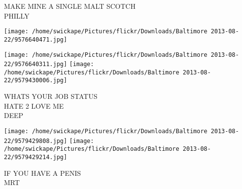 \documentclass[10pt,letterpaper]{article}
\begin{document}
MAKE MINE A SINGLE MALT SCOTCH\\
PHILLY\\
\pagebreak

\texttt{[image: /home/swickape/Pictures/flickr/Downloads/Baltimore 2013-08-22/9576640471.jpg]}

\vspace{0.25in}
\texttt{[image: /home/swickape/Pictures/flickr/Downloads/Baltimore 2013-08-22/9576640311.jpg]}
\texttt{[image: /home/swickape/Pictures/flickr/Downloads/Baltimore 2013-08-22/9579430006.jpg]}

WHATS YOUR JOB STATUS\\
HATE 2 LOVE ME\\
DEEP\\
\pagebreak

\texttt{[image: /home/swickape/Pictures/flickr/Downloads/Baltimore 2013-08-22/9579429808.jpg]}
\texttt{[image: /home/swickape/Pictures/flickr/Downloads/Baltimore 2013-08-22/9579429214.jpg]}

IF YOU HAVE A PENIS\\
MRT\\
\pagebreak
\end{document}
